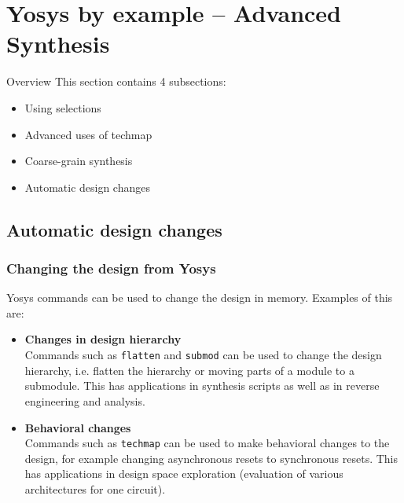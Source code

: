 
\section{Yosys by example -- Advanced Synthesis}

\begin{frame}
\sectionpage
\end{frame}

\begin{frame}{Overview}
This section contains 4 subsections:
\begin{itemize}
\item Using selections
\item Advanced uses of techmap
\item Coarse-grain synthesis
\item Automatic design changes
\end{itemize}
\end{frame}


\subsection{Automatic design changes}

\begin{frame}
\subsectionpage
\subsectionpagesuffix
\end{frame}

\subsubsection{Changing the design from Yosys}

\begin{frame}{\subsubsecname}
Yosys commands can be used to change the design in memory. Examples of this are:

\begin{itemize}
\item {\bf Changes in design hierarchy} \\
Commands such as {\tt flatten} and {\tt submod} can be used to change the design hierarchy, i.e.
flatten the hierarchy or moving parts of a module to a submodule. This has applications in synthesis
scripts as well as in reverse engineering and analysis.

\item {\bf Behavioral changes} \\
Commands such as {\tt techmap} can be used to make behavioral changes to the design, for example
changing asynchronous resets to synchronous resets. This has applications in design space exploration
(evaluation of various architectures for one circuit).
\end{itemize}
\end{frame}

